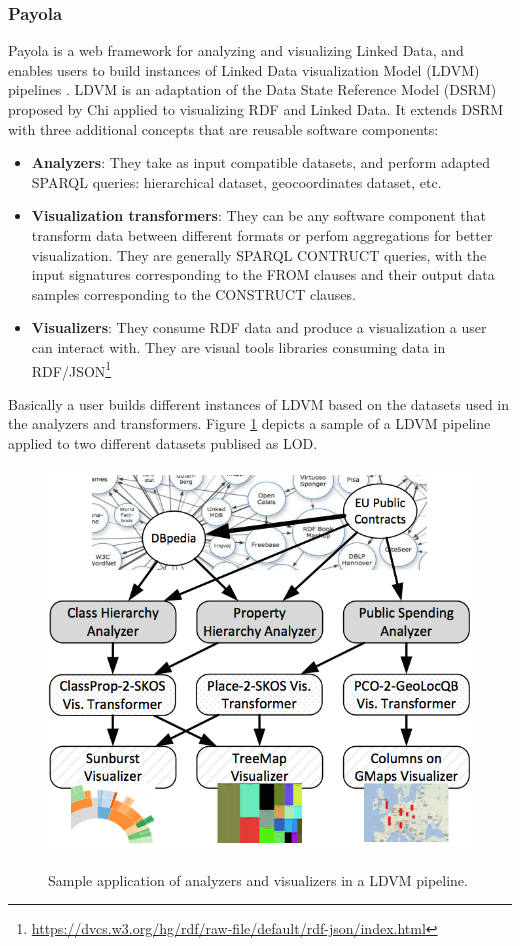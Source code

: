 \subsubsection{Payola}
Payola \cite{payola13} is a web framework for analyzing and visualizing Linked Data, and enables users to build instances of Linked Data visualization Model (LDVM) pipelines \cite{brunetti13}. LDVM is an adaptation of the Data State Reference Model (DSRM) proposed by Chi \cite{chi2000} applied to visualizing RDF and Linked Data. It extends DSRM with three additional concepts that are reusable software components:
\begin{itemize}
\item \textbf{Analyzers}: They take as input compatible datasets, and perform adapted SPARQL queries: hierarchical dataset, geocoordinates dataset, etc.  
\item \textbf{Visualization transformers}: They can be any software component that transform data between different formats or perfom aggregations for better visualization. They are generally SPARQL CONTRUCT queries, with the input signatures corresponding to the FROM clauses and their output data samples corresponding to the CONSTRUCT clauses.
\item \textbf{Visualizers}: They consume RDF data and produce a visualization a user can interact with. They are visual tools libraries consuming data in RDF/JSON\footnote{\url{https://dvcs.w3.org/hg/rdf/raw-file/default/rdf-json/index.html}}
\end{itemize}
Basically a user builds different instances of LDVM based on the datasets used in the analyzers and transformers. Figure \ref{fig:ldvm-lod} depicts a sample of a LDVM pipeline applied to two different datasets publised as LOD.

\begin{figure}
\center
\includegraphics[scale=0.8]{img/ldvm-lod.png}
\label{fig:ldvm-lod}
\caption{Sample application of analyzers and visualizers in a LDVM pipeline.}
\end{figure}


